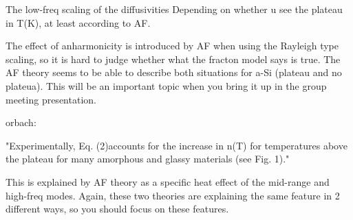 The low-freq scaling of the diffusivities Depending on whether 
u see the plateau in T(K), at least according to AF. 

The effect of anharmonicity is introduced by AF when using 
the Rayleigh type scaling, so it is hard 
to judge whether what the fracton model says is true.  The AF theory 
seems to be able to describe both situations for a-Si (plateau and 
no plateua). This will be an important 
topic when you bring it up in the group meeting presentation.

orbach:

"Experimentally, Eq. (2)accounts for
the increase in n(T) for temperatures
above the plateau for many amorphous
and glassy materials (see Fig. 1)."

This is explained by AF theory as a specific heat effect of the mid-range 
and high-freq modes.  Again, these two theories are explaining the 
same feature in 2 different ways, so you should focus on these features. 




